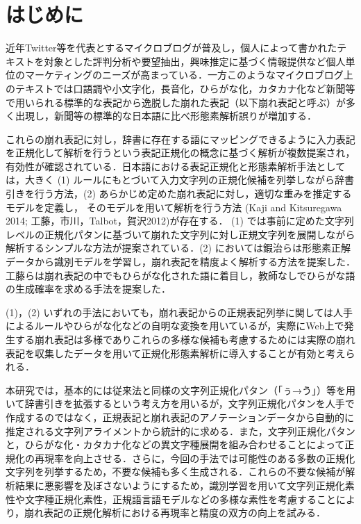 \documentclass[japanese]{jnlp_1.4}
\begin{document}
\maketitle


\section{はじめに}

近年Twitter等を代表とするマイクロブログが普及し，個人によって書かれたテキストを対象とした評判分析や要望抽出，興味推定に基づく情報提供など個人単位のマーケティングのニーズが高まっている．一方このようなマイクロブログ上のテキストでは口語調や小文字化，長音化，ひらがな化，カタカナ化など新聞等で用いられる標準的な表記から逸脱した崩れた表記（以下崩れ表記と呼ぶ）が多く出現し，新聞等の標準的な日本語に比べ形態素解析誤りが増加する．

これらの崩れ表記に対し，辞書に存在する語にマッピングできるように入力表記を正規化して解析を行うという表記正規化の概念に基づく解析が複数提案され，有効性が確認されている\cite{Han2011,Han2012,liu2012}．日本語における表記正規化と形態素解析手法としては，大きく (1) ルールにもとづいて入力文字列の正規化候補を列挙しながら辞書引きを行う方法\cite{sasano-kurohashi-okumura2013IJCNLP,oka:2013,katsuki:2011}，(2) あらかじめ定めた崩れ表記に対し，適切な重みを推定するモデルを定義し，
    そのモデルを用いて解析を行う方法 (Kaji and Kitsuregawa 2014; 工藤，市川，Talbot，賀沢2012)が存在する．\nocite{kaji-kitsuregawa:2014:EMNLP2014,kudo:2012}
(1) では事前に定めた文字列レベルの正規化パタンに基づいて崩れた文字列に対し正規文字列を展開しながら解析するシンプルな方法が提案されている．(2) においては鍜治ら\cite{kaji-kitsuregawa:2014:EMNLP2014}は形態素正解データから識別モデルを学習し，崩れ表記を精度よく解析する方法を提案した．工藤ら\cite{kudo:2012}は崩れ表記の中でもひらがな化された語に着目し，教師なしでひらがな語の生成確率を求める手法を提案した．

(1)，(2) いずれの手法においても，崩れ表記からの正規表記列挙に関しては人手によるルールやひらがな化などの自明な変換を用いているが，実際にWeb上で発生する崩れ表記は多様でありこれらの多様な候補も考慮するためには実際の崩れ表記を収集したデータを用いて正規化形態素解析に導入することが有効と考えられる．

本研究では，基本的には従来法\cite{katsuki:2011,oka:2013}と同様の文字列正規化パタン（「ぅ→う」）等を用いて辞書引きを拡張するという考え方を用いるが，文字列正規化パタンを人手で作成するのではなく，正規表記と崩れ表記のアノテーションデータから自動的に推定される文字列アライメントから統計的に求める．また，文字列正規化パタンと，ひらがな化・カタカナ化などの異文字種展開を組み合わせることによって正規化の再現率を向上させる．さらに，今回の手法では可能性のある多数の正規化文字列を列挙するため，不要な候補も多く生成される．これらの不要な候補が解析結果に悪影響を及ぼさないようにするため，識別学習を用いて文字列正規化素性や文字種正規化素性，正規語言語モデルなどの多様な素性を考慮することにより，崩れ表記の正規化解析における再現率と精度の双方の向上を試みる．
\end{document}
